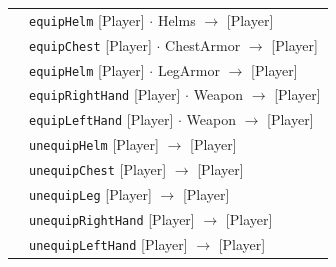 \documentclass[12pt]{report}
\begin{document}
\begin{tabular}{rl}
&\texttt{equipHelm} \textrm{[Player]} $\cdot$ \textrm{Helms} $\rightarrow$ \textrm{[Player]} \\
&\texttt{equipChest} \textrm{[Player]} $\cdot$ \textrm{ChestArmor} $\rightarrow$ \textrm{[Player]} \\
&\texttt{equipHelm} \textrm{[Player]} $\cdot$ \textrm{LegArmor} $\rightarrow$ \textrm{[Player]} \\
&\texttt{equipRightHand} \textrm{[Player]} $\cdot$ \textrm{Weapon} $\rightarrow$ \textrm{[Player]} \\
&\texttt{equipLeftHand} \textrm{[Player]} $\cdot$ \textrm{Weapon} $\rightarrow$ \textrm{[Player]} \\

&\texttt{unequipHelm} \textrm{[Player]} $\rightarrow$ \textrm{[Player]} \\
&\texttt{unequipChest} \textrm{[Player]} $\rightarrow$ \textrm{[Player]} \\
&\texttt{unequipLeg} \textrm{[Player]} $\rightarrow$ \textrm{[Player]} \\
&\texttt{unequipRightHand} \textrm{[Player]} $\rightarrow$ \textrm{[Player]} \\
&\texttt{unequipLeftHand} \textrm{[Player]} $\rightarrow$ \textrm{[Player]} \\

\end{tabular}
\end{document}
